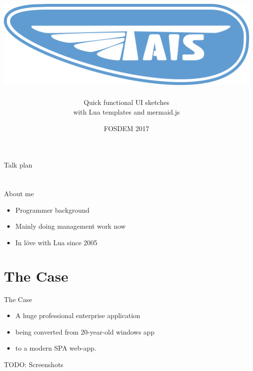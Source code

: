 \documentclass[aspectratio=43,handout,bigger]{beamer}
\title{\includegraphics[height=.15\textheight]{logo}}
\author{Quick functional UI sketches\\with Lua templates and mermaid.js}
\institute{Alexander Gladysh\\@agladysh}
\date{FOSDEM 2017}
\begin{document}
\begin{frame}[plain]
 \titlepage
\end{frame}


\begin{frame}{Talk plan}

\tableofcontents

\end{frame}


\section*{}

\begin{frame}{About me}

\begin{itemize}
\item Programmer background
\item Mainly doing management work now
\item In löve with Lua since 2005
\end{itemize}

\end{frame}

\section{The Case}

\begin{frame}{The Case}
  \begin{itemize}
    \item A huge professional enterprise application
    \item being converted from 20-year-old windows app
    \item to a modern SPA web-app.
  \end{itemize}

  TODO: Screenshots
\end{frame}

\end{document}
